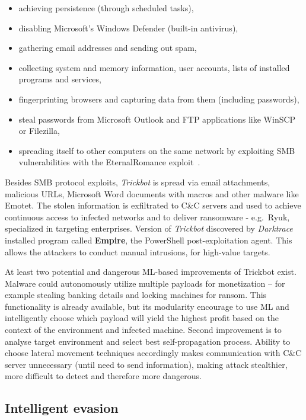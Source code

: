 \begin{itemize}
    \item achieving persistence (through scheduled tasks),
    \item disabling Microsoft’s Windows Defender (built-in antivirus),
    \item gathering email addresses and sending out spam,
    \item collecting system and memory information, user accounts, lists of installed programs and services,
    \item fingerprinting browsers and capturing data from them (including passwords),
    \item steal passwords from Microsoft Outlook and FTP applications like WinSCP or Filezilla,
    \item spreading itself to other computers on the same network by exploiting SMB vulnerabilities with the EternalRomance exploit~\cite{web:trickbot}.
\end{itemize}

Besides SMB protocol exploits, \textit{Trickbot} is spread via email attachments, malicious URLs, Microsoft Word documents with macros and other malware like Emotet.
The stolen information is exfiltrated to C\&C servers and used to achieve continuous access to infected networks and to deliver ransomware - e.g.\ Ryuk, specialized in targeting enterprises.
Version of \textit{Trickbot} discovered by \textit{Darktrace} installed program called \textbf{Empire}, the PowerShell post-exploitation agent.
This allows the attackers to conduct manual intrusions, for high-value targets.

At least two potential and dangerous ML-based improvements of Trickbot exist.
Malware could autonomously utilize multiple payloads for monetization – for example stealing banking details and locking machines for ransom.
This functionality is already available, but its modularity encourage to use ML and intelligently choose which payload will yield the highest profit based on the context of the environment and infected machine.
Second improvement is to analyse target environment and select best self-propagation process.
Ability to choose lateral movement techniques accordingly makes communication with C\&C server unnecessary (until need to send information), making attack stealthier, more difficult to detect and therefore more dangerous.

\subsection{Intelligent evasion}\label{subsec:intelligent-evasion}

